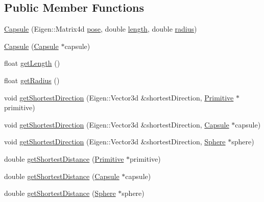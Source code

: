 \subsection*{Public Member Functions}
\begin{DoxyCompactItemize}
\item 
\hyperlink{class_capsule_aab6d0827aa8179c3f258129161a67e2e}{Capsule} (Eigen\+::\+Matrix4d \hyperlink{class_primitive_ad8b2afbad412f6046783d155c88fe312}{pose}, double \hyperlink{class_capsule_af62f20ecfc37b4c8ae88dd505ca1f196}{length}, double \hyperlink{class_capsule_a9b7e591748a2b735b35d99a2d7792f39}{radius})
\item 
\hyperlink{class_capsule_a94838c4642111c07dbf83fdc775d1a68}{Capsule} (\hyperlink{class_capsule}{Capsule} $\ast$capsule)
\item 
float \hyperlink{class_capsule_a8ff7a408a608ee32dea8c187fce5dbea}{get\+Length} ()
\item 
float \hyperlink{class_capsule_a4e98e8545ea57fe682c5a2002bd49bdb}{get\+Radius} ()
\item 
void \hyperlink{class_capsule_ad569eae23b91f33e145f06745739e428}{get\+Shortest\+Direction} (Eigen\+::\+Vector3d \&shortest\+Direction, \hyperlink{class_primitive}{Primitive} $\ast$primitive)
\item 
void \hyperlink{class_capsule_a28274c18ef5a3b9ef869caa64d5f7d5e}{get\+Shortest\+Direction} (Eigen\+::\+Vector3d \&shortest\+Direction, \hyperlink{class_capsule}{Capsule} $\ast$capsule)
\item 
void \hyperlink{class_capsule_aae076a389170bd6644f479bfe9c243bc}{get\+Shortest\+Direction} (Eigen\+::\+Vector3d \&shortest\+Direction, \hyperlink{class_sphere}{Sphere} $\ast$sphere)
\item 
double \hyperlink{class_capsule_a43bcc7bb95425a4559f7fd0289ef8b45}{get\+Shortest\+Distance} (\hyperlink{class_primitive}{Primitive} $\ast$primitive)
\item 
double \hyperlink{class_capsule_ade8880442a9230f893c296f0681ae9ad}{get\+Shortest\+Distance} (\hyperlink{class_capsule}{Capsule} $\ast$capsule)
\item 
double \hyperlink{class_capsule_a71d7821f3e7f9ac972bceb06d82f529d}{get\+Shortest\+Distance} (\hyperlink{class_sphere}{Sphere} $\ast$sphere)
\end{DoxyCompactItemize}
